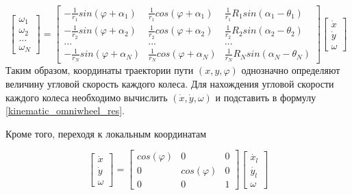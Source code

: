 \documentclass[oneside,final,14pt]{extreport}
\begin{document}
\begin{equation}
\label{kinematic_omniwheel_res}
\begin{bmatrix}
\omega_{1} \\
\omega_{2} \\
...\\
\omega_{N}
\end{bmatrix}
=
\begin{bmatrix}
-\frac{1}{r_{1}}sin(\varphi +\alpha_{1}) &
\frac{1}{r_{1}}cos(\varphi +\alpha_{1}) &
\frac{1}{r_{1}}R_{1}sin(\alpha_{1} - \theta_{1})
\\
-\frac{1}{r_{2}}sin(\varphi +\alpha_{2}) &
\frac{1}{r_{2}}cos(\varphi +\alpha_{2}) &
\frac{1}{r_{2}}R_{2}sin(\alpha_{2} - \theta_{2})
\\
... & ... & ...
\\
-\frac{1}{r_{N}}sin(\varphi +\alpha_{N}) &
\frac{1}{r_{N}}cos(\varphi +\alpha_{N}) &
\frac{1}{r_{N}}R_{N}sin(\alpha_{N} - \theta_{N})
\end{bmatrix}
\begin{bmatrix}
\dot{x} \\
\dot{y} \\
\omega
\end{bmatrix}
\end{equation}
Таким образом, координаты траектории пути $(x,y,\varphi)$ однозначно определяют величину угловой скорость каждого колеса. Для нахождения угловой скорости каждого колеса необходимо вычислить $(\dot{x},\dot{y},\omega)$ и подставить в формулу \ref{kinematic_omniwheel_res}.

\iffalse
Кроме того, переходя к локальным координатам

\begin{equation}
\begin{bmatrix}
\dot{x} \\
\dot{y} \\
\omega
\end{bmatrix}
=
\begin{bmatrix}
cos(\varphi) & 0 & 0 \\
0 & cos(\varphi) & 0 \\
0 & 0 & 1
\end{bmatrix}
\begin{bmatrix}
\dot{x_{l}} \\
\dot{y_{l}} \\
\omega
\end{bmatrix}
\end{equation}
\end{document}
